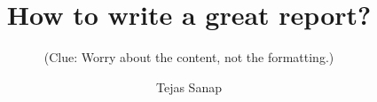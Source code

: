 \documentclass{beamer}
\title{How to write a great report?}
\subtitle{\tiny (Clue: Worry about the content, not the formatting.)}
\author{Tejas Sanap}
\begin{document}
	\begin{frame}
		\maketitle
	\end{frame}
	
\end{document}
